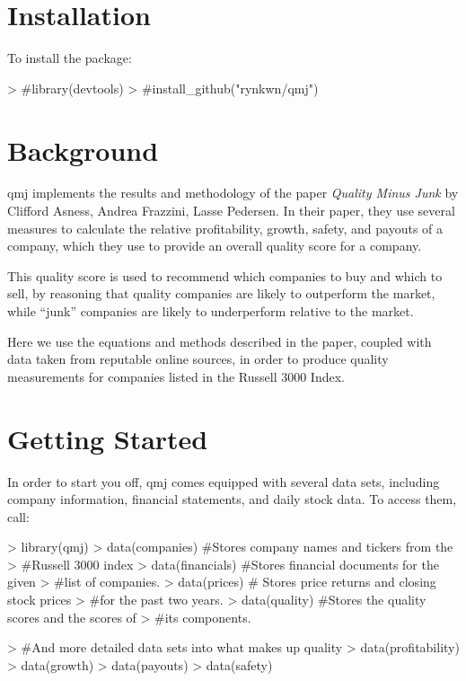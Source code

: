\documentclass[12pt]{article}
\begin{document}


\section*{Installation}
To install the package:

\begin{Schunk}
\begin{Sinput}
> #library(devtools)
> #install_github("rynkwn/qmj")
\end{Sinput}
\end{Schunk}

\section*{Background}
qmj implements the results and methodology of the paper \emph{Quality Minus Junk} by Clifford Asness, Andrea Frazzini, Lasse Pedersen. In their paper, they use several measures to calculate the relative profitability, growth, safety, and payouts of a company, which they use to provide an overall quality score for a company.

This quality score is used to recommend which companies to buy and which to sell, by reasoning that quality companies are likely to outperform the market, while ``junk'' companies are likely to underperform relative to the market.

Here we use the equations and methods described in the paper, coupled with data taken from reputable online sources, in order to produce quality measurements for companies listed in the Russell 3000 Index.

\section*{Getting Started}
In order to start you off, qmj comes equipped with several data sets, including company information, financial statements, and daily stock data. To access them, call:

\begin{Schunk}
\begin{Sinput}
> library(qmj)
> data(companies) #Stores company names and tickers from the 
> #Russell 3000 index
> data(financials) #Stores financial documents for the given 
> #list of companies.
> data(prices) # Stores price returns and closing stock prices 
> #for the past two years.
> data(quality) #Stores the quality scores and the scores of 
> #its components.
\end{Sinput}
\end{Schunk}
\begin{Schunk}
\begin{Sinput}
> #And more detailed data sets into what makes up quality
> data(profitability)
> data(growth)
> data(payouts)
> data(safety)
\end{Sinput}
\end{Schunk}
\end{document}

